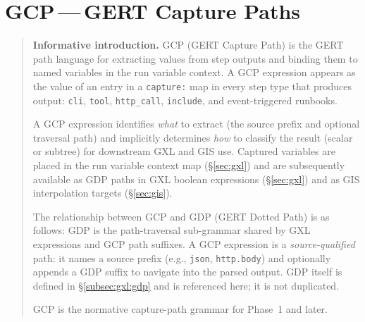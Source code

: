 %
%

\providecommand{\TODO}[1]{\textbf{\textcolor{red}{[TODO:~#1]}}}

\chapter{GCP\,---\,GERT Capture Paths}
\label{sec:gcp}

\begin{quote}
\noindent\textbf{Informative introduction.}
GCP (GERT Capture Path) is the GERT path language for extracting values
from step outputs and binding them to named variables in the run variable
context.
A GCP expression appears as the value of an entry in a \texttt{capture:}
map in every step type that produces output:
\texttt{cli}, \texttt{tool}, \texttt{http\_call}, \texttt{include},
and event-triggered runbooks.

A GCP expression identifies \emph{what} to extract (the source prefix
and optional traversal path) and implicitly determines \emph{how} to
classify the result (scalar or subtree) for downstream GXL and GIS use.
Captured variables are placed in the run variable context map
(\S\ref{sec:gxl}) and are subsequently available as GDP paths in GXL
boolean expressions (\S\ref{sec:gxl}) and as GIS interpolation targets
(\S\ref{sec:gis}).

The relationship between GCP and GDP (GERT Dotted Path) is as follows:
GDP is the path-traversal sub-grammar shared by GXL expressions and GCP
path suffixes.
A GCP expression is a \emph{source-qualified} path: it names a source
prefix (e.g., \texttt{json}, \texttt{http.body}) and optionally appends
a GDP suffix to navigate into the parsed output.
GDP itself is defined in \S\ref{subsec:gxl:gdp} and is referenced here;
it is not duplicated.

GCP is the normative capture-path grammar for Phase~1 and later.
\end{quote}

